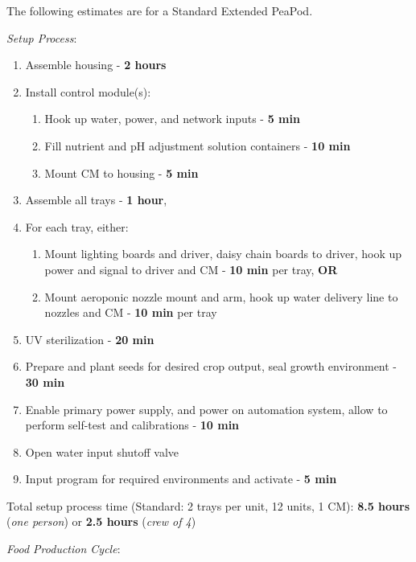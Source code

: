 \documentclass{report}
\begin{document}
The following estimates are for a Standard Extended PeaPod.

\textit{Setup Process}:

\begin{enumerate}
    \item Assemble housing - \textbf{2 hours}
    \item Install control module(s):
    \begin{enumerate}
        \item Hook up water, power, and network inputs - \textbf{5 min}
        \item Fill nutrient and pH adjustment solution containers - \textbf{10 min}
        \item Mount CM to housing - \textbf{5 min}
    \end{enumerate}
    \item Assemble all trays - \textbf{1 hour},
    \item For each tray, either:
    \begin{enumerate}
        \item Mount lighting boards and driver, daisy chain boards to driver, hook up power and signal to driver and CM - \textbf{10 min} per tray, \textbf{OR}
        \item Mount aeroponic nozzle mount and arm, hook up water delivery line to nozzles and CM - \textbf{10 min} per tray
    \end{enumerate}
    \item UV sterilization - \textbf{20 min}
    \item Prepare and plant seeds for desired crop output, seal growth environment - \textbf{30 min}
    \item Enable primary power supply, and power on automation system, allow to perform self-test and calibrations - \textbf{10 min}
    \item Open water input shutoff valve
    \item Input program for required environments and activate - \textbf{5 min}
\end{enumerate}

Total setup process time (Standard: 2 trays per unit, 12 units, 1 CM): \textbf{8.5 hours} (\textit{one person}) or \textbf{2.5 hours} (\textit{crew of 4})

\newpage

\textit{Food Production Cycle}:
\end{document}
